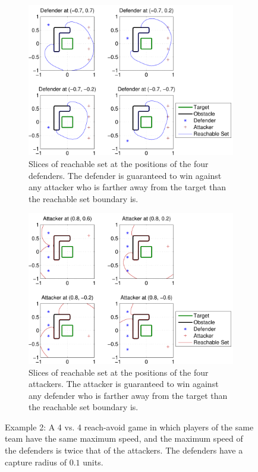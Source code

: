 \begin{figure}[h]
\centering
	\begin{subfigure}{0.45\textwidth}
	\centering
	\includegraphics[width=\textwidth]{"fig/fixed defender 2"}
	\caption{Slices of reachable set at the positions of the four defenders. The defender is guaranteed to win against any attacker who is farther away from the target than the reachable set boundary is.}
	\label{subfig:fixed_d_2}
	\end{subfigure}
	
	\begin{subfigure}{0.45\textwidth}
	\centering
	\includegraphics[width=\textwidth]{"fig/fixed attacker 2"}
	\caption{Slices of reachable set at the positions of the four attackers. The attacker is guaranteed to win against any defender who is farther away from the target than the reachable set boundary is.}
	\label{subfig:fixed_a_2}
	\end{subfigure}
\caption{Example 2: A 4 vs. 4 reach-avoid game in which players of the same team have the same maximum speed, and the maximum speed of the defenders is twice that of the attackers.  The defenders have a capture radius of $0.1$ units.}
\label{fig:results2}
\end{figure}

